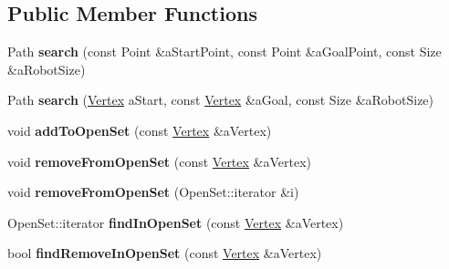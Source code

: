 \subsection*{Public Member Functions}
\begin{DoxyCompactItemize}
\item 
Path {\bfseries search} (const Point \&a\+Start\+Point, const Point \&a\+Goal\+Point, const Size \&a\+Robot\+Size)\hypertarget{class_path_algorithm_1_1_a_star_a9112cf1a7a2e991046d88a1f5cba8925}{}\label{class_path_algorithm_1_1_a_star_a9112cf1a7a2e991046d88a1f5cba8925}

\item 
Path {\bfseries search} (\hyperlink{struct_path_algorithm_1_1_vertex}{Vertex} a\+Start, const \hyperlink{struct_path_algorithm_1_1_vertex}{Vertex} \&a\+Goal, const Size \&a\+Robot\+Size)\hypertarget{class_path_algorithm_1_1_a_star_a08d4471b622ff7cef2d6a65af869ceb3}{}\label{class_path_algorithm_1_1_a_star_a08d4471b622ff7cef2d6a65af869ceb3}

\item 
void {\bfseries add\+To\+Open\+Set} (const \hyperlink{struct_path_algorithm_1_1_vertex}{Vertex} \&a\+Vertex)\hypertarget{class_path_algorithm_1_1_a_star_a63f88f24acf7bf34cd060051134c9190}{}\label{class_path_algorithm_1_1_a_star_a63f88f24acf7bf34cd060051134c9190}

\item 
void {\bfseries remove\+From\+Open\+Set} (const \hyperlink{struct_path_algorithm_1_1_vertex}{Vertex} \&a\+Vertex)\hypertarget{class_path_algorithm_1_1_a_star_afcc23a676145d6e280d1c3430af5380a}{}\label{class_path_algorithm_1_1_a_star_afcc23a676145d6e280d1c3430af5380a}

\item 
void {\bfseries remove\+From\+Open\+Set} (Open\+Set\+::iterator \&i)\hypertarget{class_path_algorithm_1_1_a_star_aba29c2585fbf49880cf5e8b9bf6d3eb5}{}\label{class_path_algorithm_1_1_a_star_aba29c2585fbf49880cf5e8b9bf6d3eb5}

\item 
Open\+Set\+::iterator {\bfseries find\+In\+Open\+Set} (const \hyperlink{struct_path_algorithm_1_1_vertex}{Vertex} \&a\+Vertex)\hypertarget{class_path_algorithm_1_1_a_star_ae78bfebdee31135fdfb2f302347f962f}{}\label{class_path_algorithm_1_1_a_star_ae78bfebdee31135fdfb2f302347f962f}

\item 
bool {\bfseries find\+Remove\+In\+Open\+Set} (const \hyperlink{struct_path_algorithm_1_1_vertex}{Vertex} \&a\+Vertex)\hypertarget{class_path_algorithm_1_1_a_star_a657aaaf577ca25e68e6a5af57214e7d4}{}\label{class_path_algorithm_1_1_a_star_a657aaaf577ca25e68e6a5af57214e7d4}


\end{DoxyCompactItemize}
